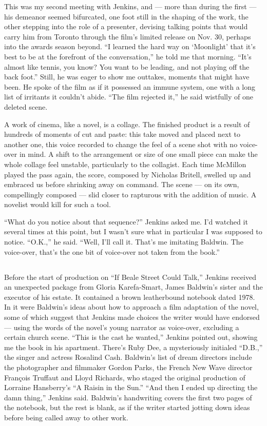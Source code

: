 This was my second meeting with Jenkins, and --- more than during the
first --- his demeanor seemed bifurcated, one foot still in the shaping
of the work, the other stepping into the role of a presenter, devising
talking points that would carry him from Toronto through the film's
limited release on Nov. 30, perhaps into the awards season beyond. ``I
learned the hard way on `Moonlight' that it's best to be at the
forefront of the conversation,'' he told me that morning. ``It's almost
like tennis, you know? You want to be leading, and not playing off the
back foot.'' Still, he was eager to show me outtakes, moments that might
have been. He spoke of the film as if it possessed an immune system, one
with a long list of irritants it couldn't abide. ``The film rejected
it,'' he said wistfully of one deleted scene.

A work of cinema, like a novel, is a collage. The finished product is a
result of hundreds of moments of cut and paste: this take moved and
placed next to another one, this voice recorded to change the feel of a
scene shot with no voice-over in mind. A shift to the arrangement or
size of one small piece can make the whole collage feel unstable,
particularly to the collagist. Each time McMillon played the pass again,
the score, composed by Nicholas Britell, swelled up and embraced us
before shrinking away on command. The scene --- on its own, compellingly
composed --- slid closer to rapturous with the addition of music. A
novelist would kill for such a tool.

``What do you notice about that sequence?'' Jenkins asked me. I'd
watched it several times at this point, but I wasn't sure what in
particular I was supposed to notice. ``O.K.,'' he said. ``Well, I'll
call it. That's me imitating Baldwin. The voice-over, that's the one bit
of voice-over not taken from the book.''

\subsection{}

Before the start of production on ``If Beale Street Could Talk,''
Jenkins received an unexpected package from Gloria Karefa-Smart, James
Baldwin's sister and the executor of his estate. It contained a brown
leatherbound notebook dated 1978. In it were Baldwin's ideas about how
to approach a film adaptation of the novel, some of which suggest that
Jenkins made choices the writer would have endorsed --- using the words
of the novel's young narrator as voice-over, excluding a certain church
scene. ``This is the cast he wanted,'' Jenkins pointed out, showing me
the book in his apartment. There's Ruby Dee, a mysteriously initialed
``D.B.,'' the singer and actress Rosalind Cash. Baldwin's list of dream
directors include the photographer and filmmaker Gordon Parks, the
French New Wave director François Truffaut and Lloyd Richards, who
staged the original production of Lorraine Hansberry's ``A Raisin in the
Sun.'' ``And then I ended up directing the damn thing,'' Jenkins said.
Baldwin's handwriting covers the first two pages of the notebook, but
the rest is blank, as if the writer started jotting down ideas before
being called away to other work.


